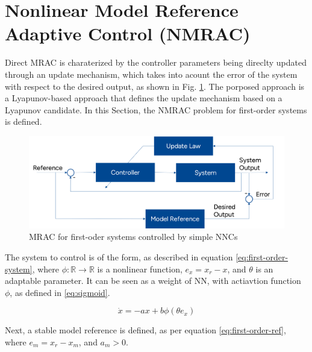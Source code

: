 \section{Nonlinear Model Reference Adaptive Control (NMRAC)}
\label{sec:NMRAC}

Direct MRAC is charaterized by the controller parameters being direclty updated through an update mechanism, which takes into acount the error of the system with respect to the desired output, as shown in Fig. \ref{fig:nonlinear-NNC-MRAC}. The porposed approach is a Lyapunov-based approach that defines the update mechanism based on a Lyapunov candidate. In this Section, the NMRAC problem for first-order systems is defined.

\begin{figure}[!t]
    \centering
    \includegraphics[width=0.8\linewidth]{images/MRAC_Blockdiagram.png}
    \caption{MRAC for first-oder systems controlled by simple NNCs}
    \label{fig:nonlinear-NNC-MRAC}
\end{figure}


The system to control is of the form, as described in equation \eqref{eq:first-order-system}, where $\phi: \mathbb{R}\rightarrow\mathbb{R}$ is a nonlinear function, $e_x=x_r - x$, and $\theta$ is an adaptable parameter. It can be seen as a weight of  NN, with actiavtion function $\phi$, as defined in \eqref{eq:sigmoid}. 

\begin{equation}
    \dot x = -ax + b\phi(\theta e_x)
    \label{eq:first-order-system}
\end{equation}

Next, a stable model reference is defined, as per equation \eqref{eq:first-order-ref}, where $e_m=x_r - x_m$, and $a_m>0$.

